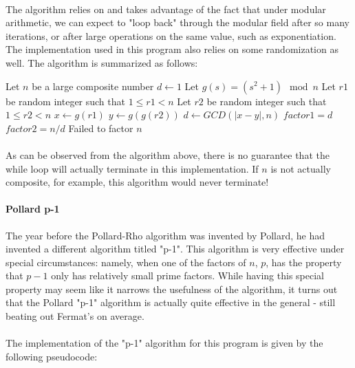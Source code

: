 \documentclass[12pt,a4paper]{article}
\begin{document}
\paragraph{}
The algorithm relies on and takes advantage of the fact that under modular 
arithmetic, we can expect to "loop back" through the modular field after so 
many iterations, or after large operations on the same value, such as 
exponentiation.  The implementation used in this program also relies on 
some randomization as well.  The algorithm is summarized as follows:

\begin{algorithm}[H]
	\begin{algorithmic}
    \State Let $n$ be a large composite number
    \State $d \gets 1$
    \State Let $g(s) = (s^2 + 1) \mod{n}$
      \State Let $r1$ be random integer such that $1 \le r1 < n$
      \State Let $r2$ be random integer such that $1 \le r2 < n$
      \State $x \gets g(r1)$
      \State $y \gets g(g(r2))$
      \State $d \gets GCD(|x - y|, n)$
    \EndWhile
      \State $factor1 = d$
      \State $factor2 = n/d$
    \Else{}
      \State Failed to factor $n$
    \EndIf
	\end{algorithmic} 
\end{algorithm}

\paragraph{}
As can be observed from the algorithm above, there is no guarantee that the 
while loop will actually terminate in this implementation.  If $n$ is not 
actually composite, for example, this algorithm would never terminate!

\paragraph{Pollard p-1}
The year before the Pollard-Rho algorithm was invented by Pollard, he had 
invented a different algorithm titled "p-1".  This algorithm is very effective 
under special circumstances:  namely, when one of the factors of $n$, $p$, has 
the property that $p-1$ only has relatively small prime factors.  While having 
this special property may seem like it narrows the usefulness of the algorithm, 
it turns out that the Pollard "p-1" algorithm is actually quite effective in 
the general - still beating out Fermat's on average.

\paragraph{}
The implementation of the "p-1" algorithm for this program is given by the 
following pseudocode:
\end{document}
